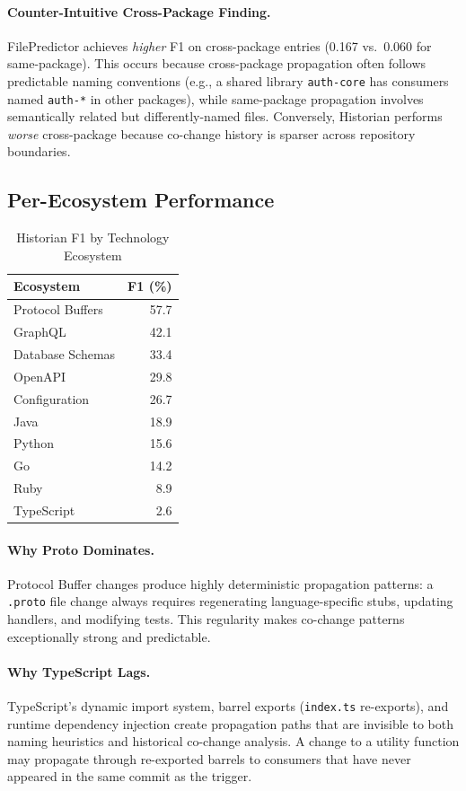 \documentclass[sigconf,nonacm]{acmart}
\begin{document}
\paragraph{Counter-Intuitive Cross-Package Finding.} FilePredictor achieves \emph{higher} F1 on cross-package entries (0.167 vs.\ 0.060 for same-package). This occurs because cross-package propagation often follows predictable naming conventions (e.g., a shared library \texttt{auth-core} has consumers named \texttt{auth-*} in other packages), while same-package propagation involves semantically related but differently-named files. Conversely, Historian performs \emph{worse} cross-package because co-change history is sparser across repository boundaries.

\subsection{Per-Ecosystem Performance}

\begin{table}[h]
\caption{Historian F1 by Technology Ecosystem}
\label{tab:ecosystem}
\begin{tabular}{lr}
\toprule
\textbf{Ecosystem} & \textbf{F1 (\%)} \\
\midrule
Protocol Buffers & 57.7 \\
GraphQL & 42.1 \\
Database Schemas & 33.4 \\
OpenAPI & 29.8 \\
Configuration & 26.7 \\
Java & 18.9 \\
Python & 15.6 \\
Go & 14.2 \\
Ruby & 8.9 \\
TypeScript & 2.6 \\
\bottomrule
\end{tabular}
\end{table}

\paragraph{Why Proto Dominates.} Protocol Buffer changes produce highly deterministic propagation patterns: a \texttt{.proto} file change always requires regenerating language-specific stubs, updating handlers, and modifying tests. This regularity makes co-change patterns exceptionally strong and predictable.

\paragraph{Why TypeScript Lags.} TypeScript's dynamic import system, barrel exports (\texttt{index.ts} re-exports), and runtime dependency injection create propagation paths that are invisible to both naming heuristics and historical co-change analysis. A change to a utility function may propagate through re-exported barrels to consumers that have never appeared in the same commit as the trigger.
\end{document}

